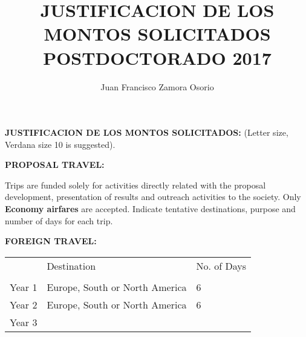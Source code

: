 \documentclass[10pt]{article}
\author{Juan Francisco Zamora Osorio}
\title{JUSTIFICACION DE LOS MONTOS SOLICITADOS POSTDOCTORADO 2017}
\begin{document}
\noindent \textbf{JUSTIFICACION DE LOS MONTOS SOLICITADOS:}
\vspace{5pt}
\vspace{5pt}
\noindent(Letter size, Verdana size 10 is suggested).



\noindent \textbf{PROPOSAL TRAVEL:  }

\noindent Trips are funded solely for activities directly related with the proposal development, presentation of results and outreach activities to the society. Only \textbf{Economy airfares} are accepted. Indicate tentative destinations, purpose and number of days for each trip.

\vspace{15pt}
\noindent\textbf{FOREIGN TRAVEL:}

\vspace{15pt}

\begin{tabular}{l|l|l|}
\cline{2-3}
                             & Destination & No. of Days \\ \cline{2-3} 
                             &             &             \\ \hline
\multicolumn{1}{|l|}{Year 1} &      Europe, South or North America       &     6        \\ \hline
\multicolumn{1}{|l|}{Year 2} &       Europe, South or North America      &      6       \\ \hline
\multicolumn{1}{|l|}{Year 3} &            &           \\ \hline
\end{tabular}
\vspace{15pt}

\begin{comment}
\vspace{15pt}
\begin{tabular}{l|l|l|}
\cline{2-3}
                             & Destino & No. de dias \\ \cline{2-3} 
                             &             &             \\ \hline
\multicolumn{1}{|l|}{Año 1} &      Europa, Sur- o Norteamerica       &     6        \\ \hline
\multicolumn{1}{|l|}{Año 2} &       Europa, Sur- o Norteamerica       &      6       \\ \hline
\multicolumn{1}{|l|}{Año 3} &            &           \\ \hline
\end{tabular}
\end{comment}
\end{document}
